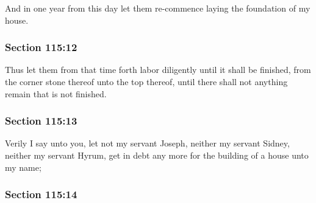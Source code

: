 		And in one year from this day let them re-commence laying the foundation of my house.


	\subsubsection{Section 115:12} %
		\label{DC115-12}

		Thus let them from that time forth labor diligently until it shall be finished, from the corner stone thereof unto the top thereof, until there shall not anything remain that is not finished.


	\subsubsection{Section 115:13} %
		\label{DC115-13}

		Verily I say unto you, let not my servant Joseph, neither my servant Sidney, neither my servant Hyrum, get in debt any more for the building of a house unto my name;


	\subsubsection{Section 115:14} %
		\label{DC115-14}


